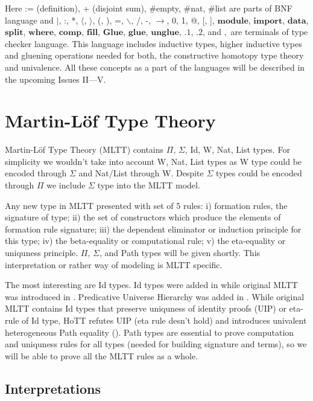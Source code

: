\documentclass[twoside]{article}
\theoremstyle{definition}
\begin{document}
Here := (definition), + (disjoint sum), \#empty, \#nat, \#list are parts of BNF language and
$\rvert$, :, *, $\langle$, $\rangle$, (, ), =, $\backslash$, /, -, $\rightarrow$, 0, 1, @, [, ],
$\mathbf{module}$, $\mathbf{import}$,
$\mathbf{data}$, $\mathbf{split}$, $\mathbf{where}$, $\mathbf{comp}$, $\mathbf{fill}$,
$\mathbf{Glue}$, $\mathbf{glue}$, $\mathbf{unglue}$,
$\mathbf{.1}$, $\mathbf{.2}$,
 and $,$ are terminals of type checker language. This language includes
inductive types, higher inductive types and gluening operations needed for
both, the constructive homotopy type theory and univalence. All these concepts as a part of the languages
will be described in the upcoming Issues II---V.

\section{Martin-Löf Type Theory}

Martin-Löf Type Theory (MLTT) contains $\Pi$, $\Sigma$, Id, W, Nat, List types.
For simplicity we wouldn't take into account W, Nat, List types as
W type could be encoded through $\Sigma$ and Nat/List through W.
Despite $\Sigma$ types could be encoded through $\Pi$ we include $\Sigma$ type into the MLTT model.

Any new type in MLTT presented with set of 5 rules: i) formation rules, the signature of type;
ii) the set of constructors which produce the elements of formation rule signature;
iii) the dependent eliminator or induction principle for this type;
iv) the beta-equality or computational rule;
v) the eta-equality or uniquness principle. $\Pi$, $\Sigma$, and Path
types will be given shortly. This interpretation or rather way of modeling is MLTT specific.

The most interesting are Id types. Id types were added in \cite{Lof84} while original MLTT was introduced in \cite{Lof72}.
Predicative Universe Hierarchy was added in \cite{Lof75}.
While original MLTT contains Id types that preserve uniquness of identity
proofs (UIP) or eta-rule of Id type, HoTT refutes UIP (eta rule desn't hold)
and introduces univalent heterogeneous Path equality (\cite{Hofmann96}).
Path types are essential to prove computation and uniquness rules for all types
(needed for building signature and terms), so we will be able to prove all
the MLTT rules as a whole.

\subsection{Interpretations}
\end{document}
